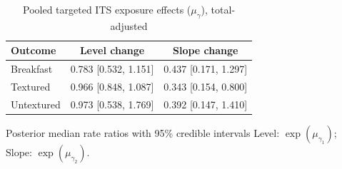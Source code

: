 \begin{table}[H]
\centering
\caption{Pooled targeted ITS exposure effects ($\mu_\gamma$), total-adjusted}
\label{tab:a4_mu_gamma_adj}
\begin{tabular}{lcc}
\toprule
Outcome & Level change & Slope change \\
\midrule
Breakfast & 0.783 [0.532, 1.151] & 0.437 [0.171, 1.297] \\
Textured & 0.966 [0.848, 1.087] & 0.343 [0.154, 0.800] \\
Untextured & 0.973 [0.538, 1.769] & 0.392 [0.147, 1.410] \\
\bottomrule
\end{tabular}
\par\smallskip\footnotesize Posterior median rate ratios with 95\% credible intervals Level: $\exp(\mu_{\gamma_1})$; Slope: $\exp(\mu_{\gamma_2})$.
\end{table}
